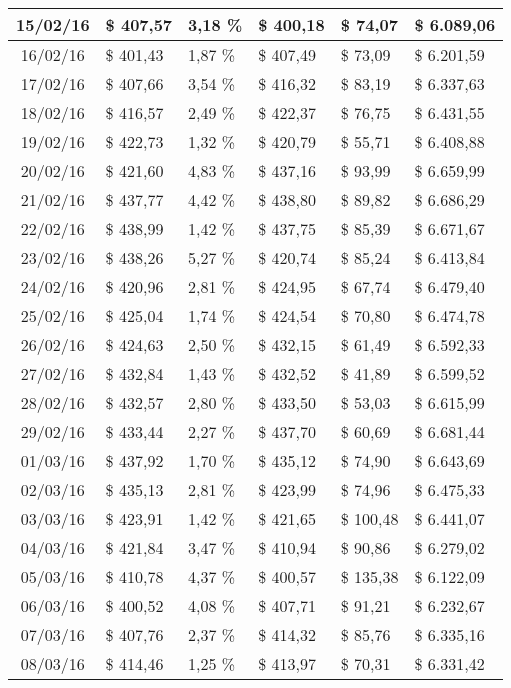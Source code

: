 \begin{small}
\begin{longtable}{|c|l|l|l|l|l|}
15/02/16 & \$ 407,57 & 3,18 \% & \$ 400,18 & \$ 74,07 & \$ 6.089,06 \\ \hline
16/02/16 & \$ 401,43 & 1,87 \% & \$ 407,49 & \$ 73,09 & \$ 6.201,59 \\ \hline
17/02/16 & \$ 407,66 & 3,54 \% & \$ 416,32 & \$ 83,19 & \$ 6.337,63 \\ \hline
18/02/16 & \$ 416,57 & 2,49 \% & \$ 422,37 & \$ 76,75 & \$ 6.431,55 \\ \hline
19/02/16 & \$ 422,73 & 1,32 \% & \$ 420,79 & \$ 55,71 & \$ 6.408,88 \\ \hline
20/02/16 & \$ 421,60 & 4,83 \% & \$ 437,16 & \$ 93,99 & \$ 6.659,99 \\ \hline
21/02/16 & \$ 437,77 & 4,42 \% & \$ 438,80 & \$ 89,82 & \$ 6.686,29 \\ \hline
22/02/16 & \$ 438,99 & 1,42 \% & \$ 437,75 & \$ 85,39 & \$ 6.671,67 \\ \hline
23/02/16 & \$ 438,26 & 5,27 \% & \$ 420,74 & \$ 85,24 & \$ 6.413,84 \\ \hline
24/02/16 & \$ 420,96 & 2,81 \% & \$ 424,95 & \$ 67,74 & \$ 6.479,40 \\ \hline
25/02/16 & \$ 425,04 & 1,74 \% & \$ 424,54 & \$ 70,80 & \$ 6.474,78 \\ \hline
26/02/16 & \$ 424,63 & 2,50 \% & \$ 432,15 & \$ 61,49 & \$ 6.592,33 \\ \hline
27/02/16 & \$ 432,84 & 1,43 \% & \$ 432,52 & \$ 41,89 & \$ 6.599,52 \\ \hline
28/02/16 & \$ 432,57 & 2,80 \% & \$ 433,50 & \$ 53,03 & \$ 6.615,99 \\ \hline
29/02/16 & \$ 433,44 & 2,27 \% & \$ 437,70 & \$ 60,69 & \$ 6.681,44 \\ \hline
01/03/16 & \$ 437,92 & 1,70 \% & \$ 435,12 & \$ 74,90 & \$ 6.643,69 \\ \hline
02/03/16 & \$ 435,13 & 2,81 \% & \$ 423,99 & \$ 74,96 & \$ 6.475,33 \\ \hline
03/03/16 & \$ 423,91 & 1,42 \% & \$ 421,65 & \$ 100,48 & \$ 6.441,07 \\ \hline
04/03/16 & \$ 421,84 & 3,47 \% & \$ 410,94 & \$ 90,86 & \$ 6.279,02 \\ \hline
05/03/16 & \$ 410,78 & 4,37 \% & \$ 400,57 & \$ 135,38 & \$ 6.122,09 \\ \hline
06/03/16 & \$ 400,52 & 4,08 \% & \$ 407,71 & \$ 91,21 & \$ 6.232,67 \\ \hline
07/03/16 & \$ 407,76 & 2,37 \% & \$ 414,32 & \$ 85,76 & \$ 6.335,16 \\ \hline
08/03/16 & \$ 414,46 & 1,25 \% & \$ 413,97 & \$ 70,31 & \$ 6.331,42 \\ \hline

\end{longtable}
\end{small}
